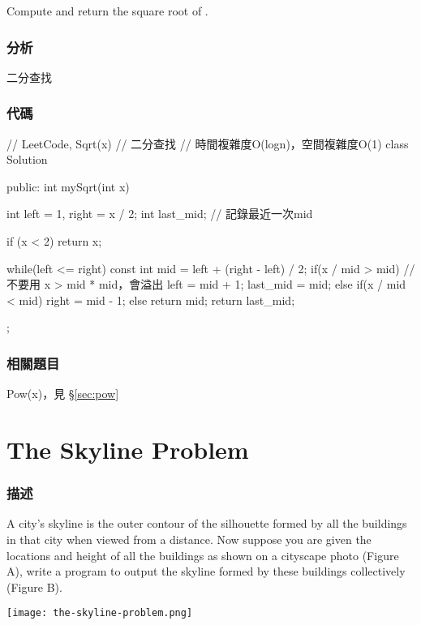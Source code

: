 Compute and return the square root of .


\subsubsection{分析}
二分查找


\subsubsection{代碼}
\begin{Code}
// LeetCode, Sqrt(x)
// 二分查找
// 時間複雜度O(logn)，空間複雜度O(1)
class Solution {
public:
    int mySqrt(int x) {
        int left = 1, right = x / 2;
        int last_mid;  // 記錄最近一次mid

        if (x < 2) return x;

        while(left <= right) {
            const int mid = left + (right - left) / 2;
            if(x / mid > mid) { // 不要用 x > mid * mid，會溢出
                left = mid + 1;
                last_mid = mid;
            } else if(x / mid < mid) {
                right = mid - 1;
            } else {
                return mid;
            }
        }
        return last_mid;
    }
};
\end{Code}


\subsubsection{相關題目}
\begindot
\item Pow(x)，見 \S \ref{sec:pow}
\myenddot

\section{The Skyline Problem}
\label{sec:the-skyline-problem}

\subsubsection{描述}
A city's skyline is the outer contour of the silhouette formed by all the buildings in that city when viewed from a distance. Now suppose you are given the locations and height of all the buildings as shown on a cityscape photo (Figure A), write a program to output the skyline formed by these buildings collectively (Figure B).

\begin{center}
\texttt{[image: the-skyline-problem.png]}\\
\label{fig:the-skyline-problem}
\end{center}

